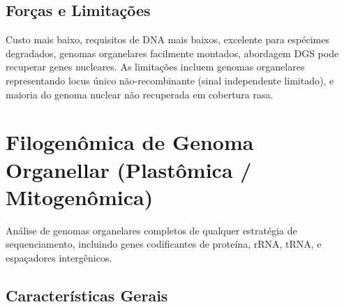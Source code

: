 \subsection{Forças e Limitações}

Custo mais baixo, requisitos de DNA mais baixos, excelente para espécimes degradados, genomas organelares facilmente montados, abordagem DGS pode recuperar genes nucleares. As limitações incluem genomas organelares representando locus único não-recombinante (sinal independente limitado), e maioria do genoma nuclear não recuperada em cobertura rasa.

\textcite{straub2012, dodsworth2015, weitemier2014}

\section{Filogenômica de Genoma Organellar (Plastômica / Mitogenômica)}

Análise de genomas organelares completos de qualquer estratégia de sequenciamento, incluindo genes codificantes de proteína, rRNA, tRNA, e espaçadores intergênicos.

\subsection{Características Gerais}

